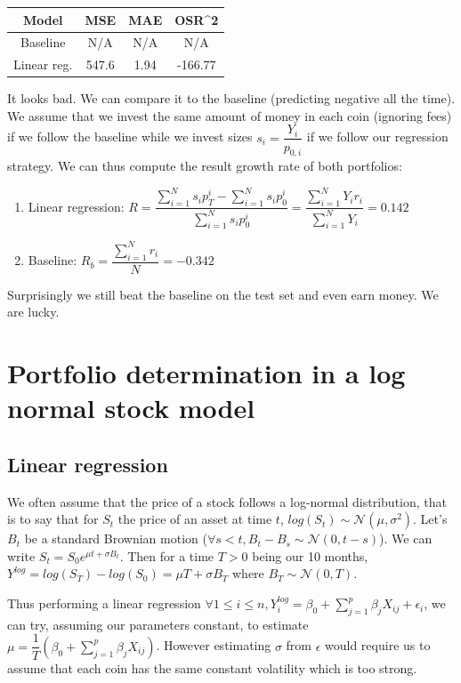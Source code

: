 \documentclass[11pt, english, letterpaper]{article}
\begin{document}
\begin{center}
    \begin{tabular}{c|ccc}
    Model & MSE & MAE & OSR^2 \\
          \hline
    Baseline  & N/A   & N/A & N/A\\
    Linear reg. & 547.6 & 1.94 & -166.77
    \end{tabular}
\end{center}

It looks bad. We can compare it to the baseline (predicting negative all the time). We assume that we invest the same amount of money in each coin (ignoring fees) if we follow the baseline while we invest sizes $s_i = \dfrac{Y_i}{p_{0,i}}$ if we follow our regression strategy.
We can thus compute the result growth rate of both portfolios:
\begin{enumerate}
    \item Linear regression: $R = \dfrac{\sum_{i=1}^N s_i p_T^i - \sum_{i=1}^N s_i p_0^i}{ \sum_{i=1}^N s_i p_0^i} = \dfrac{\sum_{i=1}^N Y_i r_i}{\sum_{i=1}^N Y_i} = 0.142$
    \item Baseline: $R_b = \dfrac{\sum_{i=1}^N r_i}{N} = -0.342$
\end{enumerate}

Surprisingly we still beat the baseline on the test set and even earn money. We are lucky.

\section{Portfolio determination in a log normal stock model}

\subsection{Linear regression}

We often assume that the price of a stock follows a log-normal distribution, that is to say that for $S_t$ the price of an asset at time $t$, $log(S_t) \sim \mathcal{N}(\mu, \sigma^2)$. Let's $B_t$ be a standard Brownian motion ($\forall s<t, B_t - B_s \sim \mathcal{N}(0, t-s)$). We can write $S_t = S_0 e^{\mu t + \sigma B_t}$.
Then for a time $T > 0$ being our 10 months, $Y^{log} = log(S_T) - log(S_0) = \mu T + \sigma B_T$
where $B_T \sim \mathcal{N}(0, T)$.

Thus performing a linear regression $\forall 1 \leq i \leq n, Y^{log}_i = \beta_0 + \sum_{j=1}^p \beta_j X_{ij} + \epsilon_i$, we can try, assuming our parameters constant, to estimate $\mu = \dfrac{1}{T} (\beta_0 + \sum_{j=1}^p \beta_j X_{ij})$. However estimating $\sigma$ from $\epsilon$ would require us to assume that each coin has the same constant volatility which is too strong.
\end{document}
